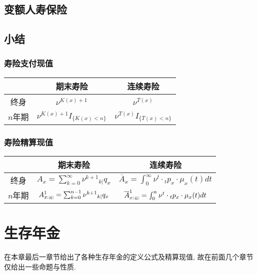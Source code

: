 \documentclass[lang=cn,10pt]{elegantbook}
\makeatletter
\DeclareRobustCommand{\annu}[1]{_{%
    \def\arraystretch{0}%
    \setlength\arraycolsep{1pt}%
    \setlength\arrayrulewidth{.2pt}%
    \begin{array}[b]{@{}c|}\hline
        \\[\arraycolsep]%
        \scriptstyle #1%
    \end{array}%
}}
\makeatother
\begin{document}
\section{变额人寿保险}

\section{小结}
\subsection{寿险支付现值}
\begin{center}
    \begin{tabular}{c|c|c}
        \hline
                & 期末寿险                     & 连续寿险                     \\
        \hline
        终身    & $\nu^{K(x)+1}$               & $\nu^{T(x)}$                 \\
        \hline
        $n$年期 & $\nu^{K(x)+1}I_{\{K(x)<n\}}$ & $ \nu^{T(x)}I_{\{T(x)<n\}} $ \\
        \hline
    \end{tabular}
\end{center}

\subsection{寿险精算现值}
\begin{center}
    \begin{tabular}{c|c|c}
        \hline
                & 期末寿险                                                          & 连续寿险                                                                                \\
        \hline
        终身    & ${A}_x=\sum_{k=0}^{\infty }{\nu^{k+1}{}_{k|}q_x}$                 & $\overline{A}_x=\int_0^{\infty}{\nu^{t}\cdot {}_tp_x\cdot \mu_{x}(t)dt}$                \\
        \hline
        $n$年期 & ${A}_{x:}^1{}_{{}\annu{n}}=\sum_{k=0}^{n-1}{\nu^{k+1}{}_{k|}q_x}$ & $\overline{A}_{x:}^1{}_{{}\annu{n}}=\int_0^{n}{\nu^{t}\cdot {}_tp_x\cdot \mu_{x}(t)dt}$ \\
        \hline
    \end{tabular}
\end{center}

\chapter{生存年金}
在本章最后一章节给出了各种生存年金的定义公式及精算现值, 故在前面几个章节仅给出一些命题与性质.
\end{document}
